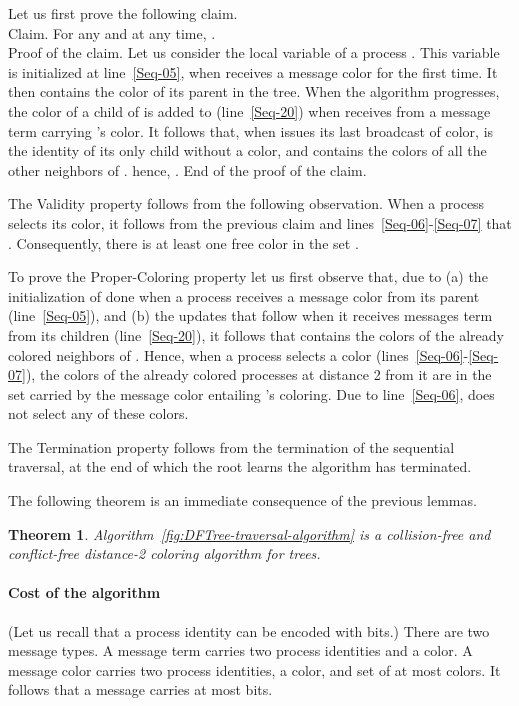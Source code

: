 \documentclass[11pt,english]{article}
\newtheorem{theorem}{Theorem}
\newcommand{\toto}{xxx}
\newenvironment{proofL}{\noindent{\bf
Proof }} {\hspace*{\fill}\par\vspace{3mm}}
\begin{document}
\begin{proofL}
  Let us first prove the following claim. \\
  Claim. For any  and  at any time, . \\
  Proof of the claim.  Let us consider the local variable 
  of a process .  This variable is initialized at
  line~\ref{Seq-05}, when  receives a message {\sc color} for
  the first time. It then contains the color of its parent in the
  tree. When the algorithm progresses, the color of a child  of
   is added to  (line~\ref{Seq-20}) when 
  receives from  a message {\sc term} carrying 's color.
  It follows that, when  issues its last broadcast of {\sc
    color},  is the identity of its
  only child without a color, and  contains the colors of
  all the other neighbors of . hence, . End
  of the proof of the claim.


The Validity property follows from the following observation.
When a process  selects its color, it follows from the previous claim
and   lines~\ref{Seq-06}-\ref{Seq-07} that
. Consequently, 
there is at least one free color in the set . 

To prove the Proper-Coloring property let us first observe that, due
to (a) the initialization of  done when a process 
receives a message {\sc color} from its parent
(line~\ref{Seq-05}), and (b) the updates that follow when it receives
messages {\sc term} from its children (line~\ref{Seq-20}), it
follows that  contains the colors of the already colored
neighbors of .  Hence, when a process  selects a color
(lines~\ref{Seq-06}-\ref{Seq-07}), the colors of the already colored
processes at distance 2 from it are in the set  carried by
the message {\sc color} entailing 's coloring.  Due to
line~\ref{Seq-06},  does not select any of these colors.

The Termination property follows from the termination of the sequential 
traversal, at the end of which the root learns the algorithm has terminated. 
\renewcommand{\toto}{lemma-three-properties}
\end{proofL}

\noindent
The following theorem is an immediate consequence of the previous lemmas. 
\begin{theorem}
\label{theo:seq-traversal-coloring}
Algorithm~{\em\ref{fig:DFTree-traversal-algorithm}} 
is a collision-free and conflict-free distance-2 coloring algorithm for trees. 
\end{theorem}




\paragraph{Cost of the algorithm}
(Let us recall that a process identity can be encoded with  bits.)
There are two message types. A message {\sc term} carries two 
process identities and a color. 
A message {\sc color} carries two process identities, 
a color, and set of at most  colors. 
It follows that a message carries at most  bits. 
\end{document}
